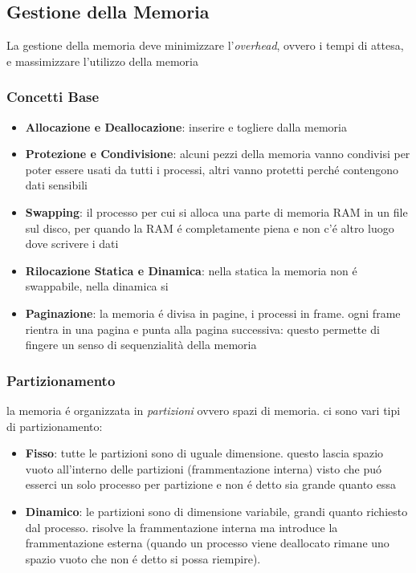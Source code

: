 \documentclass{article}
\begin{document}
{  \subsection{Gestione della Memoria}
  La gestione della memoria deve minimizzare l'\textit{overhead}, ovvero i tempi di attesa, e massimizzare l'utilizzo della memoria

  \subsubsection{Concetti Base}
  \begin{itemize}
    \item \textbf{Allocazione e Deallocazione}: inserire e togliere dalla memoria
    \item \textbf{Protezione e Condivisione}: alcuni pezzi della memoria vanno condivisi per poter essere usati da tutti i processi, altri vanno protetti perché contengono dati sensibili
    \item \textbf{Swapping}: il processo per cui si alloca una parte di memoria RAM in un file sul disco, per quando la RAM é completamente piena e non c'é altro luogo dove scrivere i dati
    \item \textbf{Rilocazione Statica e Dinamica}: nella statica la memoria non é swappabile, nella dinamica si
    \item \textbf{Paginazione}: la memoria é divisa in pagine, i processi in frame. ogni frame rientra in una pagina e punta alla pagina successiva: questo permette di fingere un senso di sequenzialità della memoria
  \end{itemize}

  \subsubsection{Partizionamento}
  la memoria é organizzata in \textit{partizioni} ovvero spazi di memoria. ci sono vari tipi di partizionamento:
  \begin{itemize}
    \item \textbf{Fisso}: tutte le partizioni sono di uguale dimensione. questo lascia spazio vuoto all'interno delle partizioni (frammentazione interna) visto che puó esserci un solo processo per partizione e non é detto sia grande quanto essa 
    \item \textbf{Dinamico}: le partizioni sono di dimensione variabile, grandi quanto richiesto dal processo. risolve la frammentazione interna ma introduce la frammentazione esterna (quando un processo viene deallocato rimane uno spazio vuoto che non é detto si possa riempire).
  \end{itemize}
  
}
\end{document}
